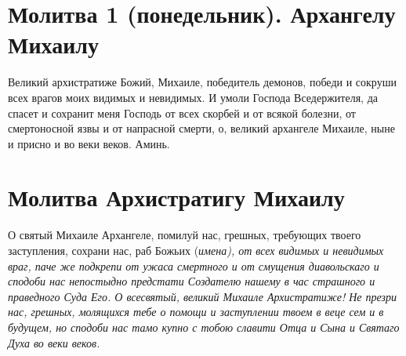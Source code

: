 

\label{_content_angelam-molitvi}

 


 
\section{Молитва 1 (понедельник). Архангелу Михаилу}\begin{mymulticols}


Великий архистратиже Божий, Михаиле, победитель демонов, победи и сокруши всех врагов моих видимых и невидимых. И умоли Господа Вседержителя, да спасет и сохранит меня Господь от всех скорбей и от всякой болезни, от смертоносной язвы и от напрасной смерти, о, великий архангеле Михаиле, ныне и присно и во веки веков. Аминь.


\end{mymulticols}

\section{Молитва Архистратигу Михаилу}\begin{mymulticols}
 


О святый Михаиле Архангеле, помилуй нас, грешных, требующих твоего заступления, сохрани нас, раб Божьих (\itshape имена\normalfont{}), от всех видимых и невидимых враг, паче же подкрепи от ужаса смертного и от смущения диавольскаго и сподоби нас непостыдно предстати Создателю нашему в час страшного и праведного Суда Его. О всесвятый, великий Михаиле Архистратиже! Не презри нас, грешных, молящихся тебе о помощи и заступлении твоем в веце сем и в будущем, но сподоби нас тамо купно с тобою славити Отца и Сына и Святаго Духа во веки веков.

\end{mymulticols}

\mychapterending



 

